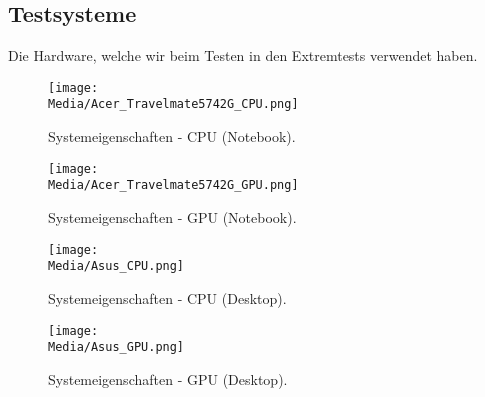 %



\clearpage



\label{Anhang:Testsysteme:Notebook}



	
\subsection*{Testsysteme}

Die Hardware, welche wir beim Testen in den Extremtests verwendet haben.\\


\begin{figure}[ht!]

	\centering
	\label{Anhang:Medien:Acer_Travelmate5742G_CPU}
	
	\texttt{[image: \\Media/Acer\_Travelmate5742G\_CPU.png]}
	
	\caption{Systemeigenschaften - CPU (Notebook).}

\end{figure}

\begin{figure}[ht!]

	\centering
	\label{Anhang:Medien:Acer_Travelmate5742G_GPU}
	
	\texttt{[image: \\Media/Acer\_Travelmate5742G\_GPU.png]}
	
	\caption{Systemeigenschaften - GPU (Notebook).}

\end{figure}



\clearpage



\label{Anhang:Testsysteme:Desktop}



\begin{figure}[ht!]

	\centering
	\label{Anhang:Medien:Asus_CPU}
	
	\texttt{[image: \\Media/Asus\_CPU.png]}
	
	\caption{Systemeigenschaften - CPU (Desktop).}

\end{figure}

\begin{figure}[ht!]

	\centering
	\label{Anhang:Medien:Asus_GPU}
	
	\texttt{[image: \\Media/Asus\_GPU.png]}
	
	\caption{Systemeigenschaften - GPU (Desktop).}

\end{figure}

